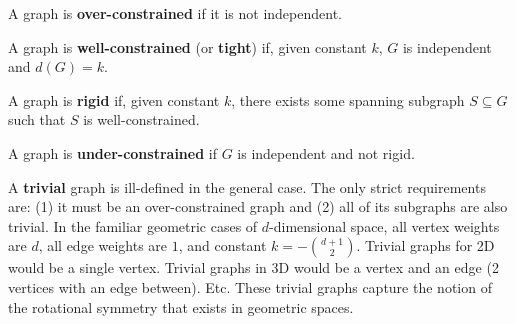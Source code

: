 \begin{definition}
    A graph is \textbf{over-constrained} if it is not independent.
\end{definition}


\begin{definition}
    A graph is \textbf{well-constrained} (or \textbf{tight}) if, given constant $k$, $G$ is independent and $d(G)=k$.
\end{definition}

\begin{definition}
    A graph is \textbf{rigid} if, given constant $k$, there exists some spanning subgraph $S\subseteq G$ such that $S$ is well-constrained.
\end{definition}

\begin{definition}
    A graph is \textbf{under-constrained} if $G$ is independent and not rigid.
\end{definition}

\begin{definition}
    A \textbf{trivial} graph is ill-defined in the general case. The only strict requirements are: (1) it must be an over-constrained graph and (2) all of its subgraphs are also trivial.
    In the familiar geometric cases of $d$-dimensional space, all vertex weights are $d$, all edge weights are $1$, and constant $k= -{{d+1}\choose{2}}$. Trivial graphs for 2D would be a single vertex. Trivial graphs in 3D would be a vertex and an edge (2 vertices with an edge between). Etc. These trivial graphs capture the notion of the rotational symmetry that exists in geometric spaces.
\end{definition}


